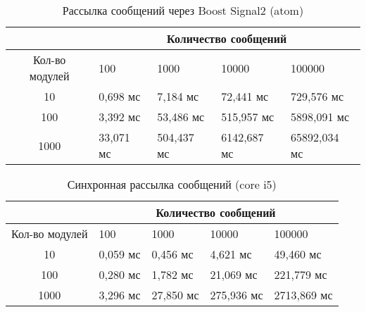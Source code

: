 \begin{table}[!htbp]
    \caption{\label{tab:atom_signals2}Рассылка сообщений через Boost Signal2 (atom)}
    \begin{center}
        \begin{tabularx}{\textwidth}{|c|X|X|X|X|}
            \hline
            & \multicolumn{4}{|c|}{Количество сообщений} \\
            \hline
            Кол-во модулей & 100   & 1000   & 10000   & 100000   \\
            \hline
            10             & 0,698 мс  & 7,184 мс  & 72,441 мс & 
            729,576 мс   \\
            \hline
            100            & 3,392 мс  & 53,486 мс  & 515,957 
            мс  & 5898,091 мс  \\
            \hline
            1000           & 33,071 мс & 504,437 мс & 6142,687 
            мс & 65892,034 мс \\
            \hline
        \end{tabularx}
    \end{center}
\end{table}


\begin{table}[!htbp]
    \caption{\label{tab:core_rrc_old}Синхронная рассылка сообщений (core i5)}
    \begin{center}
        \begin{tabularx}{\textwidth}{|c|X|X|X|X|}
            \hline
            & \multicolumn{4}{|c|}{Количество сообщений} \\
            \hline
            Кол-во модулей & 100   & 1000   & 10000   & 100000   \\
            \hline
            10             & 0,059 мс  & 0,456 мс   & 4,621 мс   
            & 49,460 мс   \\
            \hline
            100            & 0,280 мс  & 1,782 мс  & 21,069 мс  
            & 221,779 мс  \\
            \hline
            1000           & 3,296 мс & 27,850 мс & 275,936 мс & 
            2713,869 мс \\
            \hline
        \end{tabularx}
    \end{center}
\end{table}


